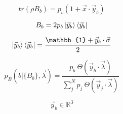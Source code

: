 \begin{equation}
tr(\rho B_b) = p_b(1 + \vec{x} \cdot \vec{y}_b) 
\end{equation}

\begin{equation}
B_b = 2p_b\ket{\vec{y}_b}\bra{\vec{y}_b}
\end{equation}

\begin{equation}
\ket{\vec{y}_b}\bra{\vec{y}_b} = \frac{\mathbb{1} + \vec{y}_b \cdot \vec{\sigma}}{2}
\end{equation}

\begin{equation}
p_B(b|\{B_b\},\vec{\lambda}) = \frac{p_b\ \Theta(\vec{y}_b \cdot \vec{\lambda})}{\sum_{j}^{N}p_j\ \Theta(\vec{y}_j \cdot \vec{\lambda})}
\end{equation}

\[\vec{y}_b \in \mathbb{R}^{3}\]

